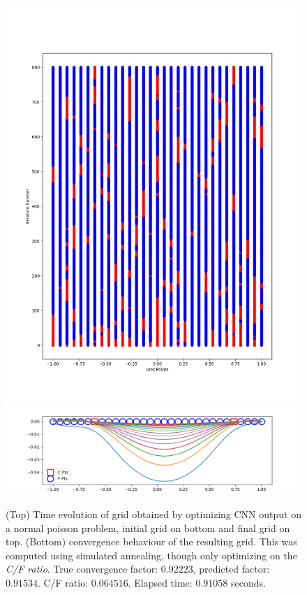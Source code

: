 \begin{figure}[h]
  \centering
  \includegraphics[scale=0.5]{figures/grid-opt/poisson_unitary_grid_time_cf_only.png}
  \includegraphics[scale=0.5]{figures/grid-opt/poisson_unitary_grid_conv_cf_only.png}
  \caption{(Top) Time evolution of grid obtained by optimizing CNN output on a normal poisson problem, initial grid on bottom and final grid on top.  (Bottom) convergence behaviour of the resulting grid.  This was computed using simulated annealing, though only optimizing on the \textit{C/F ratio}.  True convergence factor: $0.92223$, predicted factor: $0.91534$.  C/F ratio: $0.064516$.  Elapsed time: $0.91058$ seconds.  }
  \label{fig:optimized_grid_poisson_cf}
\end{figure}

